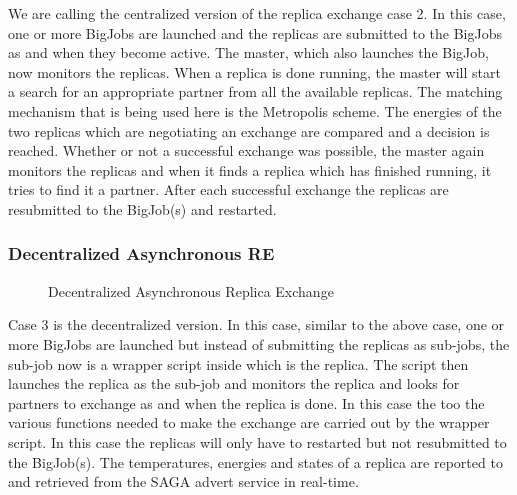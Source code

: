 \documentclass[a4paper,10pt]{article}
\begin{document}
We are calling the centralized version of the replica exchange case 2. In this case, one or more BigJobs are
launched and the replicas are submitted to the BigJobs as and when they become active. The master, which also launches the BigJob,
now monitors the replicas. When a replica is done running, the master will start a search for an appropriate partner from all the available replicas. The matching mechanism
that is being used here is the Metropolis scheme. The energies of the two replicas which are negotiating an exchange are compared and a decision is reached.
Whether or not a successful exchange was possible, the master again monitors the replicas and when it finds a replica which has finished running, it tries to find it a partner.
After each successful exchange the replicas are resubmitted to the BigJob(s) and restarted.

\subsubsection{Decentralized Asynchronous RE}

\begin{figure}
\centering


\caption{\small Decentralized Asynchronous Replica Exchange}
\label{fig:decentralized}
\end{figure}

Case 3 is the decentralized version. In this case, similar to the
above case, one or more BigJobs are launched but instead of submitting
the replicas as sub-jobs, the sub-job now is a wrapper script inside
which is the replica. The script then launches the replica as the
sub-job and monitors the replica and looks for partners to exchange as
and when the replica is done. In this case the too the various
functions needed to make the exchange are carried out by the wrapper
script. In this case the replicas will only have to restarted but not
resubmitted to the BigJob(s). The temperatures, energies and states of
a replica are reported to and retrieved from the SAGA advert service
in real-time.
\end{document}
